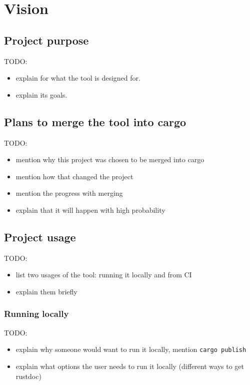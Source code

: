 \documentclass[licencjacka,en]{pracamgr}
\begin{document}

\chapter{Vision}\label{r:chapter_vision}

\section{Project purpose}

TODO:
\begin{itemize}
	\item explain for what the tool is designed for.
	\item explain its goals.
\end{itemize}

\section{Plans to merge the tool into cargo}

TODO:
\begin{itemize}
	\item mention why this project was chosen to be merged into cargo
	\item mention how that changed the project
	\item mention the progress with merging
	\item explain that it will happen with high probability
\end{itemize}

\section{Project usage}

TODO:
\begin{itemize}
	\item list two usages of the tool: running it locally and from CI
	\item explain them briefly
\end{itemize}

\subsection{Running locally}

TODO:
\begin{itemize}
	\item explain why someone would want to run it locally, mention \texttt{cargo publish}
	\item explain what options the user needs to run it locally (different ways to get rustdoc)
\end{itemize}
\end{document}
